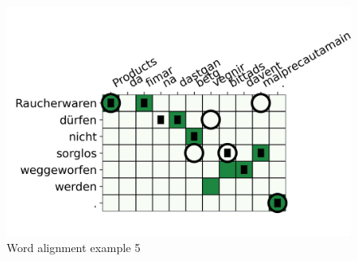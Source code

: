\begin{figure}[ht]
\includegraphics{graphics/alignments/example5.png}
\caption{Word alignment example 5}
\end{figure}